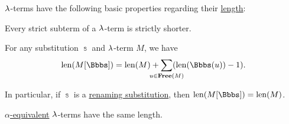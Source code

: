 \begin{proposition}\label{thm:def:lambda_term_length}
  \( \mathrm{\lambda} \)-terms have the following basic properties regarding their \hyperref[def:lambda_term_length]{length}:
  \begin{thmenum}
     Every strict subterm of a \( \mathrm{\lambda} \)-term is strictly shorter.

     For any substitution \( \Bbbs \) and \( \mathrm{\lambda} \)-term \( M \), we have
    \begin{equation}\label{eq:thm:def:lambda_term_length/substitution}
      \len(M[\Bbbs]) = \len(M) + \sum_{\mathclap{u \in \op*{Free}(M)}} (\len(\Bbbs(u)) - 1).
    \end{equation}

    In particular, if \( \Bbbs \) is a \hyperref[def:lambda_renaming]{renaming substitution}, then \( \len(M[\Bbbs]) = \len(M) \).

     \hyperref[def:lambda_term_alpha_equivalence]{\( \alpha \)-equivalent}  \( \mathrm{\lambda} \)-terms have the same length.
  \end{thmenum}
\end{proposition}
